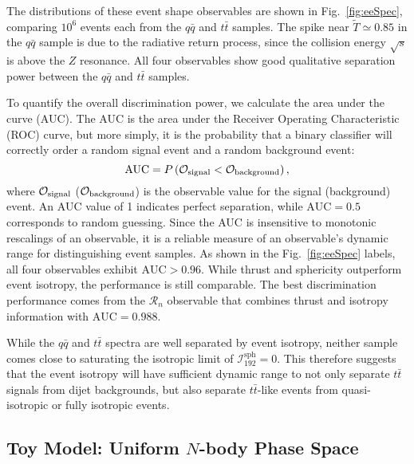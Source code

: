 \documentclass[letterpaper,11pt]{article}
\newcommand{\iso}[2]{\mathcal{I}^\text{#1}_{#2}}
\newcommand{\remd}{\mathcal{R}_n}
\DeclareRobustCommand{\Fig}[1]{Fig.~\ref{#1}}
\begin{document}
 
The distributions of these event shape observables are shown in \Fig{fig:eeSpec}, comparing $10^6$ events each from the $q\bar{q}$ and $t\bar{t}$ samples.
%
The spike near $\widetilde{T} \simeq 0.85$ in the $q \bar{q}$ sample is due to the radiative return process, since the collision energy $\sqrt{s}$ is above the $Z$ resonance.
%
All four observables show good qualitative separation power between the $q\bar{q}$ and $t\bar{t}$ samples.


To quantify the overall discrimination power, we calculate the area under the curve (AUC).
%
The AUC is the area under the Receiver Operating Characteristic (ROC) curve, but more simply, it is the probability that a binary classifier will correctly order a random signal event and a random background event:
%
\begin{equation}
\text{AUC} = P\left(\mathcal{O}_{\rm signal} < \mathcal{O}_{\rm background} \right),
\end{equation}
%
where $\mathcal{O}_{\rm signal}$ ($\mathcal{O}_{\rm background}$) is the observable value for the signal (background) event.
%
An AUC value of 1 indicates perfect separation, while $\text{AUC} = 0.5$ corresponds to random guessing.
%
Since the AUC is insensitive to monotonic rescalings of an observable, it is a reliable measure of an observable's dynamic range for distinguishing event samples.
%
As shown in the \Fig{fig:eeSpec} labels, all four observables exhibit $\text{AUC} > 0.96$.
%
While thrust and sphericity outperform event isotropy, the performance is still comparable.
%
The best discrimination performance comes from the $\remd$ observable that combines thrust and isotropy information with $\text{AUC} = 0.988$.


While the $q\bar{q}$ and $t\bar{t}$ spectra are well separated by event isotropy, neither sample comes close to saturating the isotropic limit of $\iso{sph}{192} = 0$. 
%
This therefore suggests that the event isotropy will have sufficient dynamic range to not only separate $t\bar{t}$ signals from dijet backgrounds, but also separate $t\bar{t}$-like events from quasi-isotropic or fully isotropic events.


\subsection{Toy Model: Uniform $N$-body Phase Space}
\label{subsec:uniformNbody_ee}
\end{document}
